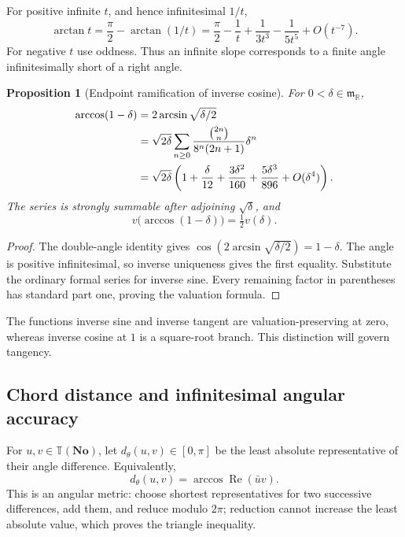 \documentclass[11pt]{article}
\numberwithin{equation}{section}
\newtheorem{proposition}[theorem]{Proposition}
\theoremstyle{definition}
\newcommand{\No}{\mathbf{No}}
\newcommand{\R}{\mathbb R}
\newcommand{\mm}{\mathfrak m}
\newcommand{\TT}{\mathbb T}
\newcommand{\re}{\operatorname{Re}}
\begin{document}
For positive infinite $t$, and hence infinitesimal $1/t$,
\begin{equation}\label{eq:ataninfty}
 \arctan t=\frac\pi2-\arctan(1/t)
 =\frac\pi2-\frac1t+\frac1{3t^3}-\frac1{5t^5}+O(t^{-7}).
\end{equation}
For negative $t$ use oddness. Thus an infinite slope corresponds to a finite angle infinitesimally short of a right angle.

\begin{proposition}[Endpoint ramification of inverse cosine]\label{prop:acosendpoint}
For $0<\delta\in\mm_{\R}$,
\begin{align}
 \arccos(1-\delta)
 &=2\arcsin\sqrt{\delta/2}\label{eq:acosseries}\\
 &=\sqrt{2\delta}\sum_{n\ge0}
 \frac{\binom{2n}{n}}{8^n(2n+1)}\delta^n\notag\\
 &=\sqrt{2\delta}\left(1+\frac\delta{12}
       +\frac{3\delta^2}{160}+\frac{5\delta^3}{896}+O(\delta^4)\right).
 \notag
\end{align}
The series is strongly summable after adjoining $\sqrt\delta$, and
\begin{equation}\label{eq:acosval}
 v\bigl(\arccos(1-\delta)\bigr)=\tfrac12v(\delta).
\end{equation}
\end{proposition}
\begin{proof}
The double-angle identity gives $\cos(2\arcsin\sqrt{\delta/2})=1-\delta$. The angle is positive infinitesimal, so inverse uniqueness gives the first equality. Substitute the ordinary formal series for inverse sine. Every remaining factor in parentheses has standard part one, proving the valuation formula.
\end{proof}
The functions inverse sine and inverse tangent are valuation-preserving at zero, whereas inverse cosine at $1$ is a square-root branch. This distinction will govern tangency.

\subsection{Chord distance and infinitesimal angular accuracy}
For $u,v\in\TT(\No)$, let $d_\theta(u,v)\in[0,\pi]$ be the least absolute representative of their angle difference. Equivalently,
\[
 d_\theta(u,v)=\arccos\re(\bar uv).
\]
This is an angular metric: choose shortest representatives for two successive differences, add them, and reduce modulo $2\pi$; reduction cannot increase the least absolute value, which proves the triangle inequality.
\end{document}
